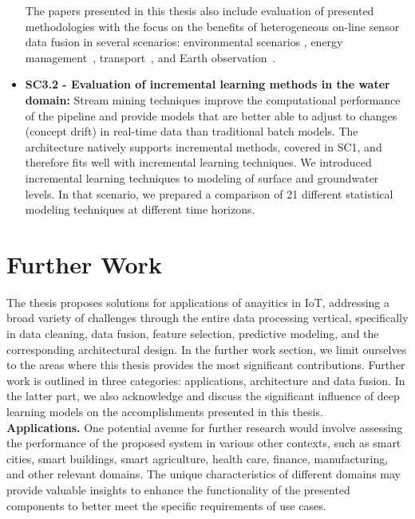 \begin{itemize}
        The papers presented in this thesis also include evaluation of presented methodologies with the focus on the benefits of heterogeneous on-line sensor data fusion in several scenarios: environmental scenarios \cite{kenda:2018:autonomous, kenda:2020:water-modeling, kenda:2022:water-framework}, energy management~\cite{kenda:2019:fusion}, transport~\cite{kenda:2019:fusion}, and Earth observation~\cite{koprivec:2020:fastener}.
    \item \textbf{SC3.2 - Evaluation of incremental learning methods in the water domain: }
        Stream mining techniques improve the computational performance of the pipeline and provide models that are better able to adjust to changes (concept drift) in real-time data than traditional batch models.
        The architecture natively supports incremental methods, covered in SC1, and therefore fits well with incremental learning techniques.
        We introduced incremental learning techniques to modeling of surface and groundwater levels.
        In that scenario, we prepared a comparison of 21 different statistical modeling techniques at different time horizons.    
\end{itemize}

\section{Further Work}

The thesis proposes solutions for applications of anayitics in IoT, addressing a broad variety of challenges through the entire data processing vertical, specifically in data cleaning, data fusion, feature selection, predictive modeling, and the corresponding architectural design. 
In the further work section, we limit ourselves to the areas where this thesis provides the most significant contributions.
Further work is outlined in three categories: applications, architecture and data fusion. 
In the latter part, we also acknowledge and discuss the significant influence of deep learning models on the accomplishments presented in this thesis. \\

\noindent \textbf{Applications.} 
One potential avenue for further research would involve assessing the performance of the proposed system in various other contexts, such as smart cities, smart buildings, smart agriculture, health care, finance, manufacturing, and other relevant domains.
The unique characteristics of different domains may provide valuable insights to enhance the functionality of the presented components to better meet the specific requirements of use cases. \\

